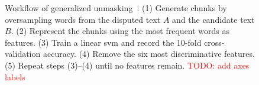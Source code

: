        

\begin{figure}[htbp]
    \centering
    
    \caption{Workflow of generalized unmasking~\citep{bevendorff_generalizing_2019}: (1) Generate chunks by oversampling words from the disputed text $A$ and the candidate text $B$. (2) Represent the chunks using the most frequent words as features. (3) Train a linear \ac{svm} and record the 10-fold cross-validation accuracy. (4) Remove the six most discriminative features. (5) Repeat steps (3)–(4) until no features remain. \textcolor{red}{TODO: add axes labels}}
    \label{fig:generalized_unmasking}
\end{figure}
